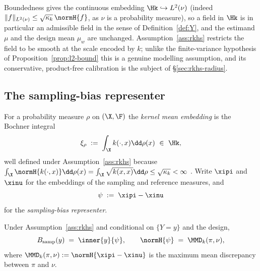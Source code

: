 Boundedness gives the continuous embedding $\Hk\hookrightarrow L^2(\nu)$
(indeed $\|f\|_{L^2(\nu)}\le\sqrt{\kappa_k}\,\normH{f}$, as $\nu$ is a
probability measure), so a field in $\Hk$ is in particular an admissible field
in the sense of Definition~\ref{def:Y}, and the estimand $\mu$ and the design
mean $\mu_w$ are unchanged. Assumption~\ref{ass:rkhs} restricts the field to be
smooth at the scale encoded by $k$; unlike the finite-variance hypothesis of
Proposition~\ref{prop:l2-bound} this is a genuine modelling assumption, and its
conservative, product-free calibration is the subject of
\S\ref{sec:rkhs-radius}.

\subsection{The sampling-bias representer}
\label{sec:rkhs-representer}

\begin{definition}
\label{def:embedding}
For a probability measure $\rho$ on $(\X,\F)$ the \emph{kernel mean embedding}
is the Bochner integral
\[
  \xi_\rho \;:=\; \int_\X k(\cdot,x)\dd\rho(x)\ \in\ \Hk ,
\]
well defined under Assumption~\ref{ass:rkhs} because
$\int_\X\normH{k(\cdot,x)}\dd\rho(x)=\int_\X\sqrt{k(x,x)}\dd\rho\le\sqrt{\kappa_k}<\infty$
\citep{smola2007,muandet2017}. Write $\xipi$ and $\xinu$ for the embeddings of
the sampling and reference measures, and
\[
  \psi \;:=\; \xipi-\xinu
\]
for the \emph{sampling-bias representer}.
\end{definition}

\begin{proposition}
\label{prop:representer}
Under Assumption~\ref{ass:rkhs} and conditional on $\{Y=y\}$ and the design,
\[
  B_{\mathrm{samp}}(y)\;=\;\inner{y}{\psi},
  \qquad
  \normH{\psi}\;=\;\MMD_k(\pi,\nu),
\]
where $\MMD_k(\pi,\nu):=\normH{\xipi-\xinu}$ is the maximum mean discrepancy
between $\pi$ and $\nu$.
\end{proposition}

